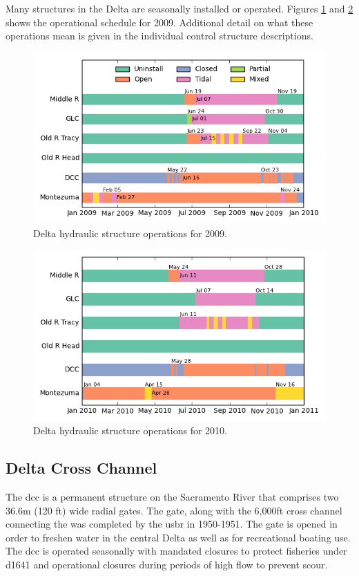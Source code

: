 Many structures in the Delta are seasonally installed or operated. Figures \ref{fig:gate_schedule_2009}
and \ref{fig:gate_schedule_2010} shows the operational schedule for 2009. 
Additional detail on what these operations mean is given 
in the individual control structure descriptions.


\begin{figure}
	\centering
		\includegraphics[width=\textwidth]{image/gate_schedule_2009}
	\caption{Delta hydraulic structure operations for 2009.}
	\label{fig:gate_schedule_2009}
\end{figure}

\begin{figure}
	\centering
		\includegraphics{image/gate_schedule_2010}
	\caption{Delta hydraulic structure operations for 2010.}
	\label{fig:gate_schedule_2010}
\end{figure}


\subsection{Delta Cross Channel} The \gls{dcc} is a permanent structure on the 
Sacramento River that comprises two 36.6m (120 ft) wide radial gates. The gate, along with the 
6,000ft cross channel connecting the  was completed by the \gls{usbr} in 1950-1951. The gate is 
opened in order to freshen water in the central Delta as well as for recreational boating use. 
The \gls{dcc} is operated seasonally with mandated closures to protect fisheries 
under \gls{d1641} and operational closures during periods of high flow to prevent scour. 

